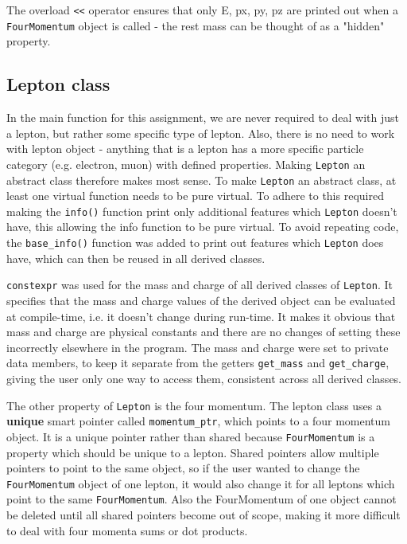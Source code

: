 \documentclass[11pt, letterpaper]{article}
\begin{document}
The overload \verb|<<| operator ensures that only E, px, py, pz are printed out when a \verb|FourMomentum| object is called - the rest mass can be thought of as a "hidden" property.

\subsection{Lepton class}
In the main function for this assignment, we are never required to deal with just a lepton, but rather some specific type of lepton. Also, there is no need to work with lepton object - anything that is a lepton has a more specific particle category (e.g. electron, muon) with defined properties. Making \verb|Lepton| an abstract class therefore makes most sense. To make \verb|Lepton| an abstract class, at least one virtual function needs to be pure virtual. To adhere to this required making the \verb|info()| function print only additional features which \verb|Lepton| doesn't have, this allowing the info function to be pure virtual. To avoid repeating code, the \verb|base_info()| function was added to print out features which \verb|Lepton| does have, which can then be reused in all derived classes.

\verb|constexpr| was used for the mass and charge of all derived classes of \verb|Lepton|. It specifies that the mass and charge values of the derived object can be evaluated at compile-time, i.e. it doesn't change during run-time. It makes it obvious that mass and charge are physical constants and there are no changes of setting these incorrectly elsewhere in the program. The mass and charge were set to private data members, to keep it separate from the getters \verb|get_mass| and \verb|get_charge|, giving the user only one way to access them, consistent across all derived classes.

The other property of \verb|Lepton| is the four momentum. The lepton class uses a \textbf{unique} smart pointer called \verb|momentum_ptr|, which points to a four momentum object. It is a unique pointer rather than shared because \verb|FourMomentum| is a property which should be unique to a lepton. Shared pointers allow multiple pointers to point to the same object, so if the user wanted to change the \verb|FourMomentum| object of one lepton, it would also change it for all leptons which point to the same \verb|FourMomentum|. Also the FourMomentum of one object cannot be deleted until all shared pointers become out of scope, making it more difficult to deal with four momenta sums or dot products.
\end{document}
